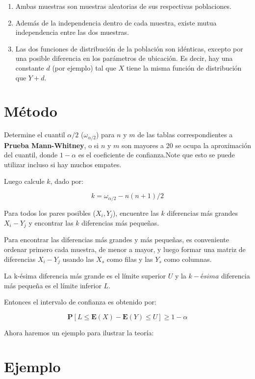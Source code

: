 \documentclass[
  a4paper,
  oneside,
  openany]{book}
\begin{document}
\begin{enumerate}
\def\labelenumi{\arabic{enumi})}
\item
  Ambas muestras son muestras aleatorias de sus respectivas poblaciones.
\item
  Además de la independencia dentro de cada muestra, existe mutua independencia entre las dos muestras.
\item
  Las dos funciones de distribución de la población son idénticas, excepto por una posible diferencia en los parámetros de ubicación. Es decir, hay una constante \(d\) (por ejemplo) tal que \(X\) tiene la misma función de distribución que \(Y + d\).
\end{enumerate}

\hypertarget{muxe9todo}{%
\section{Método}\label{muxe9todo}}

Determine el cuantil \(\alpha/2\) (\(\omega_{\alpha/2}\)) para \(n\) y \(m\) de las tablas correspondientes a \textbf{Prueba Mann-Whitney}, o si \(n\) y \(m\) son mayores a 20 se ocupa la aproximación del cuantil, donde \(1-\alpha\) es el coeficiente de confianza.Note que esto se puede utilizar incluso si hay muchos empates.

Luego calcule \(k\), dado por:

\[k= \omega_{\alpha/2}-n(n+1)/2\]

Para todos los pares posibles (\(X_{i},Y_{j}\)), encuentre las \(k\) diferencias más grandes \(X_{i}-Y_{j}\) y encontrar las \(k\) diferencias más pequeñas.

Para encontrar las diferencias más grandes y más pequeñas, es conveniente ordenar primero cada muestra, de menor a mayor, y luego formar una matriz de diferencias \(X_{i}-Y_{j}\) usando las \(X_s\) como filas y las \(Y_s\) como columnas.

La k-ésima diferencia más grande es el límite superior \(U\) y la \(k-ésima\) diferencia más pequeña es el límite inferior \(L\).

Entonces el intervalo de confianza es obtenido por:

\[\mathbf{P}[L\leq \mathbf{E}(X)-\mathbf{E}(Y)\leq U]\geq 1-\alpha\]

Ahora haremos un ejemplo para ilustrar la teoría:

\hypertarget{ejemplo-6}{%
\section{Ejemplo}\label{ejemplo-6}}
\end{document}
